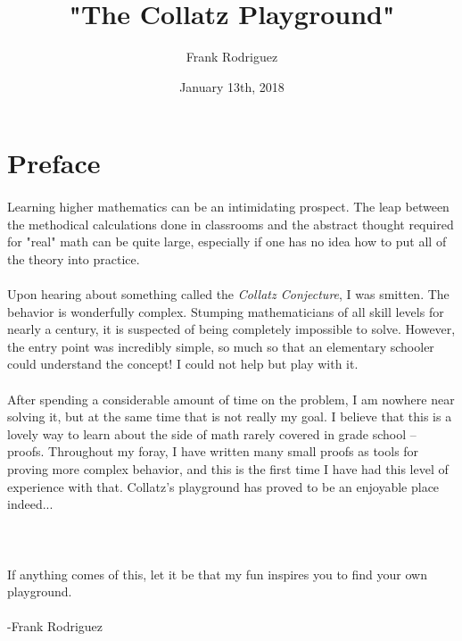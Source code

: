 \documentclass[12pt,letterpaper]{article}
\title{"The Collatz Playground"}
\author{Frank Rodriguez}
\date{January 13th, 2018}
\begin{document}
	
	\maketitle
	\newpage
	
	
	\tableofcontents
	\newpage
	
	\section*{Preface}
	
		\paragraph{} Learning higher mathematics can be an intimidating prospect. The leap between the methodical calculations done in classrooms and the abstract thought required for "real" math can be quite large, especially if one has no idea how to put all of the theory into practice. 
		\paragraph{} Upon hearing about something called the \textit{Collatz Conjecture}, I was smitten. The behavior is wonderfully complex. Stumping mathematicians of all skill levels for nearly a century, it is suspected of being completely impossible to solve. However, the entry point was incredibly simple, so much so that an elementary schooler could understand the concept!  I could not help but play with it.
		\paragraph{} After spending a considerable amount of time on the problem, I am nowhere near solving it, but at the same time that is not really my goal. I believe that this is a lovely way to learn about the side of math rarely covered in grade school -- proofs. Throughout my foray, I have written many small proofs as tools for proving more complex behavior, and this is the first time I have had this level of experience with that. Collatz's playground has proved to be an enjoyable place indeed...
		\\ \\ \\
		\paragraph{} If anything comes of this, let it be that my fun inspires you to find your own playground. \\ \\ -Frank Rodriguez
		
\end{document}
